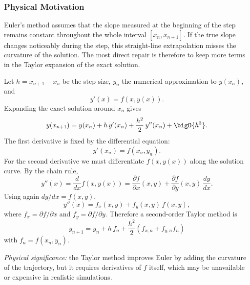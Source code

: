 \subsubsection*{Physical Motivation}
Euler's method assumes that the slope measured at the beginning of the step
remains constant throughout the whole interval $[x_n,x_{n+1}]$. If the true
slope changes noticeably during the step, this straight-line extrapolation
misses the curvature of the solution. The most direct repair is therefore to
keep more terms in the Taylor expansion of the exact solution.

Let $h=x_{n+1}-x_n$ be the step size, $y_n$ the numerical approximation to
$y(x_n)$, and
\begin{equation}
    y'(x)=f(x,y(x)).
    \label{eq:lec06:ode-standard}
\end{equation}
Expanding the exact solution around $x_n$ gives
\begin{equation}
    y(x_{n+1})
    = y(x_n)+h\,y'(x_n)+\frac{h^2}{2}\,y''(x_n)+\bigO{h^3}.
    \label{eq:lec06:taylor-solution}
\end{equation}
The first derivative is fixed by the differential equation:
\begin{equation}
    y'(x_n)=f(x_n,y_n).
    \label{eq:lec06:first-derivative}
\end{equation}
For the second derivative we must differentiate $f(x,y(x))$ along the
solution curve. By the chain rule,
\begin{equation}
    y''(x)
    = \frac{d}{dx}f(x,y(x))
    = \frac{\partial f}{\partial x}(x,y)
      +\frac{\partial f}{\partial y}(x,y)\,\frac{dy}{dx}.
    \label{eq:lec06:chain-rule}
\end{equation}
Using again $dy/dx=f(x,y)$,
\begin{equation}
    y''(x)
    = f_x(x,y)+f_y(x,y)\,f(x,y),
    \label{eq:lec06:second-derivative}
\end{equation}
where $f_x=\partial f/\partial x$ and $f_y=\partial f/\partial y$. Therefore
a second-order Taylor method is
\begin{equation}
    \boxed{
    y_{n+1}
    = y_n+h\,f_n+\frac{h^2}{2}\left(f_{x,n}+f_{y,n}f_n\right)}
    \label{eq:lec06:taylor-method}
\end{equation}
with $f_n=f(x_n,y_n)$.

\textit{Physical significance:} the Taylor method improves Euler by adding
the curvature of the trajectory, but it requires derivatives of $f$ itself,
which may be unavailable or expensive in realistic simulations.

